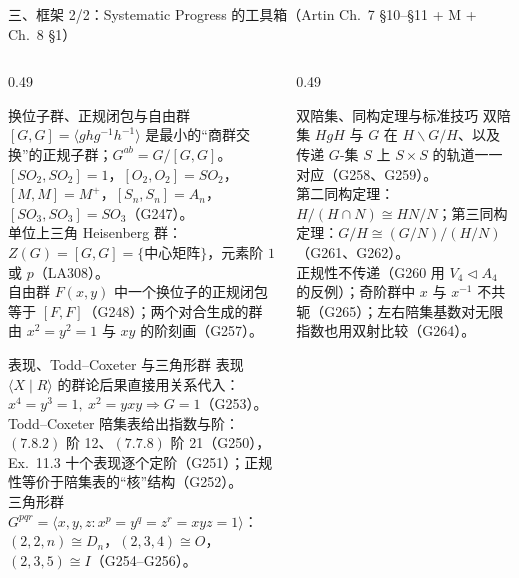 \documentclass[aspectratio=169,10pt,fontset=none]{ctexbeamer}
\begin{document}
\begin{frame}[t]{三、框架 2/2：Systematic Progress 的工具箱（Artin Ch.~7 \S10--\S11 + M + Ch.~8 \S1）}
  \label{sec:framework2}
  \begin{columns}[T,onlytextwidth]
    \begin{column}{0.49\textwidth}
      \begin{block}{\footnotesize 换位子群、正规闭包与自由群}
        \scriptsize
        $[G,G]=\langle g h g^{-1}h^{-1}\rangle$ 是最小的“商群交换”的正规子群；$G^{ab}=G/[G,G]$。\\
        $[SO_2,SO_2]=1$，$[O_2,O_2]=SO_2$，$[M,M]=M^+$，$[S_n,S_n]=A_n$，$[SO_3,SO_3]=SO_3$（G247）。\\
        单位上三角 Heisenberg 群：$Z(G)=[G,G]=\{\text{中心矩阵}\}$，元素阶 $1$ 或 $p$（LA308）。\\
        自由群 $F(x,y)$ 中一个换位子的正规闭包等于 $[F,F]$（G248）；两个对合生成的群由 $x^2=y^2=1$ 与 $xy$ 的阶刻画（G257）。
      \end{block}
      \begin{block}{\footnotesize 表现、Todd--Coxeter 与三角形群}
        \scriptsize
        表现 $\langle X\mid R\rangle$ 的群论后果直接用关系代入：$x^4=y^3=1,\ x^2=yxy\Rightarrow G=1$（G253）。\\
        Todd--Coxeter 陪集表给出指数与阶：$(7.8.2)$ 阶 12、$(7.7.8)$ 阶 21（G250），Ex.~11.3 十个表现逐个定阶（G251）；正规性等价于陪集表的“核”结构（G252）。\\
        三角形群 $G^{pqr}=\langle x,y,z:x^p=y^q=z^r=xyz=1\rangle$：$(2,2,n)\cong D_n$，$(2,3,4)\cong O$，$(2,3,5)\cong I$（G254--G256）。
      \end{block}
    \end{column}
    \begin{column}{0.49\textwidth}
      \begin{block}{\footnotesize 双陪集、同构定理与标准技巧}
        \scriptsize
        双陪集 $HgH$ 与 $G$ 在 $H\backslash G/H$、以及传递 $G$-集 $S$ 上 $S\times S$ 的轨道一一对应（G258、G259）。\\
        第二同构定理：$H/(H\cap N)\cong HN/N$；第三同构定理：$G/H\cong (G/N)/(H/N)$（G261、G262）。\\
        正规性不传递（G260 用 $V_4\triangleleft A_4$ 的反例）；奇阶群中 $x$ 与 $x^{-1}$ 不共轭（G265）；左右陪集基数对无限指数也用双射比较（G264）。
      \end{block}

\end{column}
\end{columns}
\end{frame}
\end{document}

